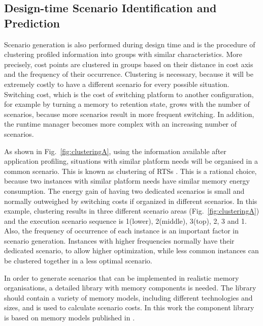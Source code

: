 \subsection{Design-time Scenario Identification and Prediction}

Scenario generation is also performed during design time and is the procedure of clustering profiled information into groups with similar characteristics. More precisely, cost points are clustered in groups based on their distance in cost axis and the frequency of their occurrence. Clustering is necessary, because it will be extremely costly to have a different scenario for every possible situation. Switching cost, which is the cost of switching platform to another configuration, for example by turning a memory to retention state, grows with the number of scenarios, because more scenarios result in more frequent switching. In addition, the runtime manager becomes more complex with an increasing number of scenarios.

As shown in Fig.~\ref{fig:clusteringA}, using the information available after application profiling, situations with similar platform needs will be organised in a common scenario. This is known as clustering of RTSs \cite{Gheorghita2007}. This is a rational choice, because two instances with similar platform needs have similar memory energy consumption. The energy gain of having two dedicated scenarios is small and normally outweighed by switching costs if organized in different scenarios. In this example, clustering results in three different scenario areas (Fig.~\ref{fig:clusteringA}) and the execution scenario sequence is 1(lower), 2(middle), 3(top), 2, 3 and 1. Also, the frequency of occurrence of each instance is an important factor in scenario generation. Instances with higher frequencies normally have their dedicated scenario, to allow higher optimization, while less common instances can be clustered together in a less optimal scenario. 

In order to generate scenarios that can be implemented in realistic memory organisations, a detailed library with memory components is needed. The library should contain a variety of memory models, including different technologies and sizes, and is used to calculate scenario costs. In this work the component library is based on memory models published in \cite{Artes2011}.

